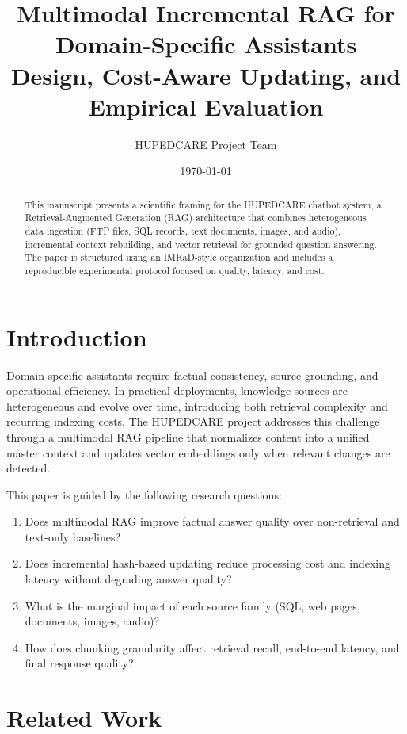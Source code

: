 \documentclass[11pt,a4paper]{article}
\title{Multimodal Incremental RAG for Domain-Specific Assistants\\
Design, Cost-Aware Updating, and Empirical Evaluation}
\author{HUPEDCARE Project Team}
\date{\today}
\begin{document}
\maketitle

\begin{abstract}
This manuscript presents a scientific framing for the HUPEDCARE chatbot system, a Retrieval-Augmented Generation (RAG) architecture that combines heterogeneous data ingestion (FTP files, SQL records, text documents, images, and audio), incremental context rebuilding, and vector retrieval for grounded question answering. The paper is structured using an IMRaD-style organization and includes a reproducible experimental protocol focused on quality, latency, and cost.
\end{abstract}

\section{Introduction}

Domain-specific assistants require factual consistency, source grounding, and operational efficiency. In practical deployments, knowledge sources are heterogeneous and evolve over time, introducing both retrieval complexity and recurring indexing costs. The HUPEDCARE project addresses this challenge through a multimodal RAG pipeline that normalizes content into a unified master context and updates vector embeddings only when relevant changes are detected.

This paper is guided by the following research questions:
\begin{enumerate}[label=RQ\arabic*:,leftmargin=2.4cm]
	\item Does multimodal RAG improve factual answer quality over non-retrieval and text-only baselines?
	\item Does incremental hash-based updating reduce processing cost and indexing latency without degrading answer quality?
	\item What is the marginal impact of each source family (SQL, web pages, documents, images, audio)?
	\item How does chunking granularity affect retrieval recall, end-to-end latency, and final response quality?
\end{enumerate}

\section{Related Work}
\end{document}
